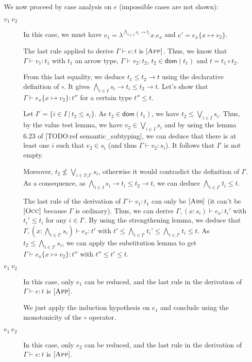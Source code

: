 \documentclass[a4paper]{article}%
\newcommand{\apply}[2]{#1\circ#2}
\newcommand{\dom}[1]{\textsf{dom}(#1)}
\newcommand{\alt}{~|~}
\newcommand{\subst}[2]{\{#1 \mapsto #2\}}
\theoremstyle{definition}
\newcommand {\Rule}[1] {[\textsc{#1}]}
\begin{document}
    We now proceed by case analysis on $e$ (impossible cases are not shown):

    \begin{description}
      \item[$v_1\ v_2$] In this case, we must have $v_1=\lambda^{\bigwedge_{i\in I} s_i \rightarrow t_i}x.e_x$ and $e'=e_x\subst x {v_2}$.

      The last rule applied to derive $\Gamma \vdash e:t$ is $\Rule{App}$.
      Thus, we know that $\Gamma \vdash v_1 : t_1$ with $t_1$ an arrow type, $\Gamma \vdash v_2 : t_2$, $t_2 \in \dom {t_1}$ and $t=\apply {t_1} {t_2}$.

      From this last equality, we deduce $t_1 \leq t_2 \rightarrow t$ using the declarative definition of $\circ$.
      It gives $\bigwedge_{i\in I} s_i \rightarrow t_i \leq t_2 \rightarrow t$.
      Let's show that $\Gamma \vdash e_x\subst x {v_2}:t''$ for a certain type $t''\leq t$.

      Let $I'=\{i\in I\alt t_2 \leq s_i\}$. As $t_2 \in \dom {t_1}$, we have $t_2 \leq \bigvee_{i\in I} s_i$.
      Thus, by the value test lemma, we have $v_2 \in \bigvee_{i\in I} s_i$ and by using the lemma 6.23 of [TODO:ref semantic_subtyping],
      we can deduce that there is at least one $i$ such that $v_2 \in s_i$ (and thus $\Gamma \vdash v_2 : s_i$).
      It follows that $I'$ is not empty.

      Moreover, $t_2 \not\leq \bigvee_{i\in I\setminus I'} s_i$, otherwise it would contradict the definition of $I'$.
      As a consequence, as $\bigwedge_{i\in I} s_i \rightarrow t_i \leq t_2 \rightarrow t$,
      we can deduce $\bigwedge_{i \in I'}t_i \leq t$.

      The last rule of the derivation of $\Gamma \vdash v_1 : t_1$ can only be $\Rule{Abs}$ (it can't be $\Rule{Occ}$ because $\Gamma$ is ordinary).
      Thus, we can derive $\Gamma,(x:s_i) \vdash e_x : t_i'$ with $t_i' \leq t_i$ for any $i\in I'$. By using the strengthening lemma, we deduce that
      $\Gamma, (x:\bigwedge_{i\in I'} s_i) \vdash e_x:t'$ with $t'\leq \bigwedge_{i\in I'} t_i' \leq \bigwedge_{i\in I'} t_i \leq t$.
      As $t_2 \leq \bigwedge_{i\in I'} s_i$, we can apply the substitution lemma to get $\Gamma \vdash e_x\subst x {v_2}:t''$ with $t'' \leq t' \leq t$.

      \item[$e_1\ v_2$] In this case, only $e_1$ can be reduced, and the last rule in the derivation of $\Gamma \vdash e:t$ is $\Rule{App}$.

      We just apply the induction hypothesis on $e_1$ and conclude using the monotonicity of the $\circ$ operator.
      \item[$e_1\ e_2$] In this case, only $e_2$ can be reduced, and the last rule in the derivation of $\Gamma \vdash e:t$ is $\Rule{App}$.


\end{description}
\end{document}
